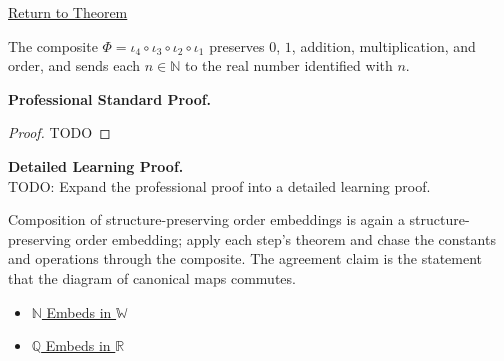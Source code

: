 \newpage
{}
\label{prf:embedding-chain-compatibility}

\begin{remark*}[Return]
\hyperref[thm:embedding-chain-compatibility]{Return to Theorem}
\end{remark*}

\begin{theorem*}
The composite $\Phi=\iota_{4}\circ\iota_{3}\circ\iota_{2}\circ\iota_{1}$ preserves $0$, $1$, addition, multiplication, and order, and sends each $n\in\mathbb{N}$ to the real number identified with $n$.
\end{theorem*}

\textbf{Professional Standard Proof.}~\\
\begin{proof}
TODO
\end{proof}

\textbf{Detailed Learning Proof.}~\\
TODO: Expand the professional proof into a detailed learning proof.

\begin{remark*}
Composition of structure-preserving order embeddings is again a structure-preserving order embedding; apply each step's theorem and chase the constants and operations through the composite. The agreement claim is the statement that the diagram of canonical maps commutes.
\end{remark*}

\begin{dependencies}
\begin{itemize}
  \item \hyperref[thm:n-embeds-in-w]{$\mathbb{N}$ Embeds in $\mathbb{W}$}
  \item \hyperref[thm:q-embeds-in-r]{$\mathbb{Q}$ Embeds in $\mathbb{R}$}
\end{itemize}
\end{dependencies}
